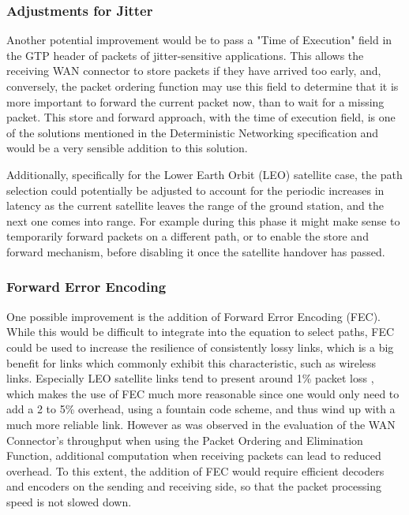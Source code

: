 \subsubsection{Adjustments for Jitter}

Another potential improvement would be to pass a "Time of Execution" field in the GTP header of packets of jitter-sensitive applications. This allows the receiving WAN connector to store packets if they have arrived too early, and, conversely, the packet ordering function may use this field to determine that it is more important to forward the current packet now, than to wait for a missing packet. This store and forward approach, with the time of execution field, is one of the solutions mentioned in the Deterministic Networking specification and would be a very sensible addition to this solution.

Additionally, specifically for the Lower Earth Orbit (LEO) satellite case, the path selection could potentially be adjusted to account for the periodic increases in latency as the current satellite leaves the range of the ground station, and the next one comes into range. For example during this phase it might make sense to temporarily forward packets on a different path, or to enable the store and forward mechanism, before disabling it once the satellite handover has passed.

\subsubsection{Forward Error Encoding}

One possible improvement is the addition of Forward Error Encoding (FEC). While this would be difficult to integrate into the equation to select paths, FEC could be used to increase the resilience of consistently lossy links, which is a big benefit for links which commonly exhibit this characteristic, such as wireless links. Especially LEO satellite links tend to present around 1\% packet loss \cite{LEO_MEASURE}, which makes the use of FEC much more reasonable since one would only need to add a 2 to 5\% overhead, using a fountain code scheme, and thus wind up with a much more reliable link. However as was observed in the evaluation of the WAN Connector's throughput when using the Packet Ordering and Elimination Function, additional computation when receiving packets can lead to reduced overhead. To this extent, the addition of FEC would require efficient decoders and encoders on the sending and receiving side, so that the packet processing speed is not slowed down.

